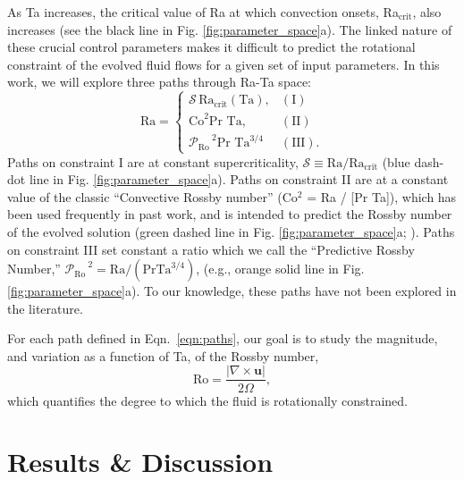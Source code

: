 \documentclass[twocolumn, amsmath, amsfonts, amssymb]{aastex62}
\newcommand{\grad}{\ensuremath{\nabla}}
\newcommand{\pro}{\ensuremath{\mathcal{P}_{\text{Ro}}\,}}
\begin{document}
As Ta increases, the critical value of Ra at which convection onsets,
Ra$_{\text{crit}}$, also increases (see the black line in Fig. \ref{fig:parameter_space}a). 
The linked nature of these crucial
control parameters makes it difficult to predict the rotational constraint of the evolved
fluid flows for a given set of input parameters. In this work, we will
explore three paths through Ra-Ta space:
\begin{equation}
\text{Ra} = 
\begin{cases}
\mathcal{S}\,\text{Ra}_\text{crit}(\text{Ta}), & (\text{I})\\
\text{Co}^2\text{Pr Ta}, & (\text{II}) \\
\pro^2 \text{Pr Ta}^{3/4} & (\text{III}).
\end{cases}
\label{eqn:paths}
\end{equation}
Paths on constraint I are at constant supercriticality, 
$\mathcal{S} \equiv \text{Ra}/\text{Ra}_{\text{crit}}$
(blue dash-dot line in Fig. \ref{fig:parameter_space}a).
Paths on constraint II are at a constant value of the classic
``Convective Rossby number'' (Co$^2$ = Ra / [Pr Ta]), which has been used frequently 
in past work, and is intended to predict the Rossby number of the
evolved solution (green dashed line in Fig. \ref{fig:parameter_space}a; 
\citet{julien&all1996, brummell&all1996}). Paths on constraint
III set constant a ratio which we call the ``Predictive Rossby Number,'' 
$\pro^2 = \text{Ra}/(\text{Pr}\text{Ta}^{3/4})$, 
(e.g., orange solid line in Fig. \ref{fig:parameter_space}a).
To our knowledge, these paths have not been explored
in the literature.



For each path defined in Eqn.~\ref{eqn:paths}, 
our goal is to study the magnitude, and variation as
a function of Ta, of the Rossby number,
\begin{equation}
\text{Ro} = \frac{|\grad\times \bm{u}|}{2 \Omega},
\label{eqn:ro}
\end{equation}
which quantifies the degree to which the fluid is rotationally constrained.



\section{Results \& Discussion}
\end{document}
